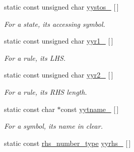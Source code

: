 \begin{DoxyCompactItemize}
\item 
\hypertarget{classyy_1_1CParser_aee94ab5e206d0075d761d1515f26165c}{static const unsigned char \hyperlink{classyy_1_1CParser_aee94ab5e206d0075d761d1515f26165c}{yystos\-\_\-} \mbox{[}$\,$\mbox{]}}\label{classyy_1_1CParser_aee94ab5e206d0075d761d1515f26165c}

\begin{DoxyCompactList}\small\item\em For a state, its accessing symbol. \end{DoxyCompactList}\item 
static const unsigned char \hyperlink{classyy_1_1CParser_a55e9961fafd87c212377c2279cb3082c}{yyr1\-\_\-} \mbox{[}$\,$\mbox{]}
\begin{DoxyCompactList}\small\item\em For a rule, its L\-H\-S. \end{DoxyCompactList}\item 
static const unsigned char \hyperlink{classyy_1_1CParser_a033a79c9242cc952389e582ad2c6d5db}{yyr2\-\_\-} \mbox{[}$\,$\mbox{]}
\begin{DoxyCompactList}\small\item\em For a rule, its R\-H\-S length. \end{DoxyCompactList}\item 
\hypertarget{classyy_1_1CParser_a2c764c8115928263f0df72da8ebfc805}{static const char $\ast$const \hyperlink{classyy_1_1CParser_a2c764c8115928263f0df72da8ebfc805}{yytname\-\_\-} \mbox{[}$\,$\mbox{]}}\label{classyy_1_1CParser_a2c764c8115928263f0df72da8ebfc805}

\begin{DoxyCompactList}\small\item\em For a symbol, its name in clear. \end{DoxyCompactList}\item 
\hypertarget{classyy_1_1CParser_a066572a90bdaad0bc2e68e136d60fc6e}{static const \hyperlink{classyy_1_1CParser_a75194fde4bb83b43553c5c277db54e0d}{rhs\-\_\-number\-\_\-type} \hyperlink{classyy_1_1CParser_a066572a90bdaad0bc2e68e136d60fc6e}{yyrhs\-\_\-} \mbox{[}$\,$\mbox{]}}\label{classyy_1_1CParser_a066572a90bdaad0bc2e68e136d60fc6e}


\end{DoxyCompactItemize}
